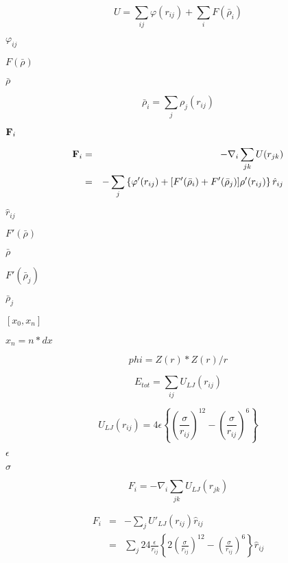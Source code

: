 \documentclass{article}
\begin{document}
\[ U = \sum_{ij} \varphi(r_{ij}) + \sum_i F({\bar\rho_i}) \]
\pagebreak

$\varphi_{ij}$
\pagebreak

$F(\bar\rho)$
\pagebreak

$\bar\rho$
\pagebreak

\[ \bar\rho_i = \sum_j \rho_j(r_{ij}) \]
\pagebreak

${\bf F}_i$
\pagebreak

\begin{eqnarray*} {\bf F}_i & = & -\nabla_i \sum_{jk} U(r_{jk})\\ & = & - \sum_j\left\{ \varphi'(r_{ij}) + [F'(\bar\rho_i) + F'(\bar\rho_j)]\rho'(r_{ij}) \right\} \hat{r}_{ij} \end{eqnarray*}
\pagebreak

$\hat{r}_{ij}$
\pagebreak

$ F'(\bar\rho) $
\pagebreak

$ \bar\rho $
\pagebreak

$ F'(\bar\rho_j) $
\pagebreak

$ \bar\rho_j $
\pagebreak

$[x_0, x_n]$
\pagebreak

$x_n = n*dx$
\pagebreak

\[phi = Z(r) * Z(r) / r\]
\pagebreak

\[ E_{tot} = \sum_{ij} U_{LJ}(r_{ij}) \]
\pagebreak

\[ U_{LJ}(r_{ij}) = 4 \epsilon \left\{ \left(\frac{\sigma}{r_{ij}}\right)^{12} - \left(\frac{\sigma}{r_{ij}}\right)^6 \right\} \]
\pagebreak

$\epsilon$
\pagebreak

$\sigma$
\pagebreak

\[ F_i = -\nabla_i \sum_{jk} U_{LJ}(r_{jk}) \]
\pagebreak

\begin{eqnarray*} F_i &=& - \sum_j U'_{LJ}(r_{ij})\hat{r}_{ij}\\ &=& \sum_j 24 \frac{\epsilon}{r_{ij}} \left\{ 2 \left(\frac{\sigma}{r_{ij}}\right)^{12} - \left(\frac{\sigma}{r_{ij}}\right)^6 \right\} \hat{r}_{ij} \end{eqnarray*}
\pagebreak
\end{document}
